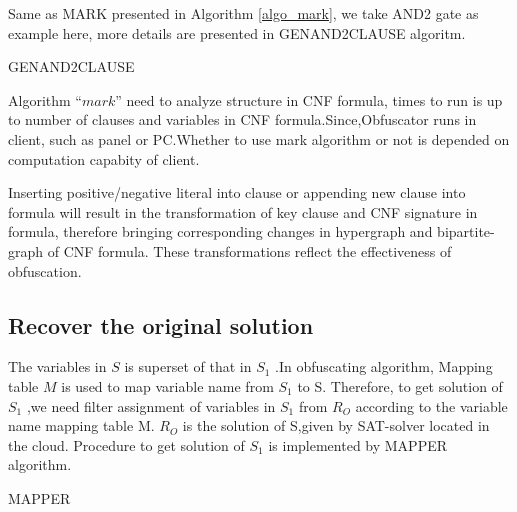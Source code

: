 \documentclass[runningheads,a4paper]{llncs}
\begin{document}
Same as MARK presented in Algorithm \ref{algo_mark}, 
we take AND2 gate as example here, 
more details are presented in GENAND2CLAUSE algoritm.

\begin{algorithm}
\caption{GENAND2CLAUSE}
\label{algo_gen}
\end{algorithm}



Algorithm $“mark”$  need to analyze structure in CNF formula, 
times to run is up to number of clauses and variables in CNF formula.Since,Obfuscator runs in client, 
such as panel or PC.Whether to use mark algorithm or not is depended on computation capabity of client.

Inserting positive/negative literal into clause or appending new clause into formula will result in the transformation of key clause and CNF signature in formula, 
therefore bringing corresponding changes in hypergraph and bipartite-graph of CNF formula.
These transformations reflect the effectiveness of obfuscation.
\subsection{Recover the original solution}

The variables in $S$ is superset of that in $S_1$ .In obfuscating algorithm, Mapping table $M$ is used to map variable name from $S_1$  to S. 
Therefore, to get solution of $S_1$  ,we need filter assignment of variables in $S_1$  from  $R_O$  according to the variable name mapping table M.  
$R_O$  is the solution of S,given by SAT-solver located in the cloud. Procedure to get solution of $S_1$  is implemented by MAPPER algorithm.


\begin{algorithm}
\caption{MAPPER}
\label{algo_map}
\end{algorithm}
\end{document}
